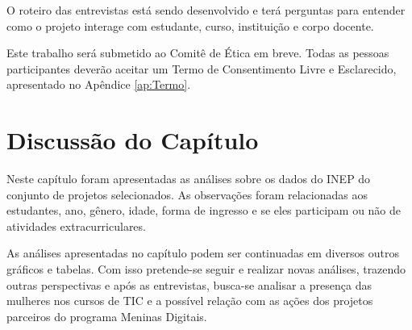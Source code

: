 O roteiro das entrevistas está sendo desenvolvido e terá perguntas para entender como o projeto interage com estudante, curso, instituição e corpo docente.

Este trabalho será submetido ao Comitê de Ética em breve. Todas as pessoas participantes deverão aceitar um Termo de Consentimento Livre e Esclarecido, apresentado no Apêndice \ref{ap:Termo}.

\section{Discussão do Capítulo}\label{sec:discussaoCapituloAnalises}
Neste capítulo foram apresentadas as análises sobre os dados do INEP do conjunto de projetos selecionados. As observações foram relacionadas aos estudantes, ano, gênero, idade, forma de ingresso e se eles participam ou não de atividades extracurriculares.

As análises apresentadas no capítulo podem ser continuadas em diversos outros gráficos e tabelas. Com isso pretende-se seguir e realizar novas análises, trazendo outras perspectivas e após as entrevistas, busca-se analisar a presença das mulheres nos cursos de TIC e a possível relação com as ações dos projetos parceiros do programa Meninas Digitais.